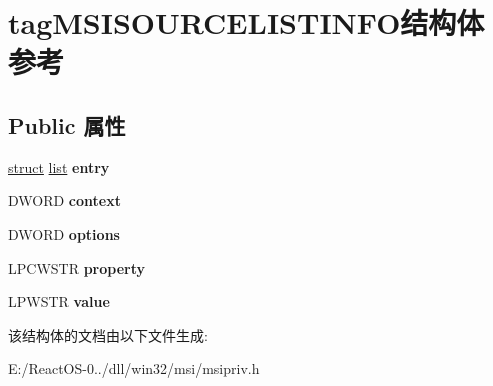 \hypertarget{structtag_m_s_i_s_o_u_r_c_e_l_i_s_t_i_n_f_o}{}\section{tag\+M\+S\+I\+S\+O\+U\+R\+C\+E\+L\+I\+S\+T\+I\+N\+F\+O结构体 参考}
\label{structtag_m_s_i_s_o_u_r_c_e_l_i_s_t_i_n_f_o}
\subsection*{Public 属性}
\begin{DoxyCompactItemize}
\item 
\mbox{\label{structtag_m_s_i_s_o_u_r_c_e_l_i_s_t_i_n_f_o_a439652af2991387df3b4a41bfffcbc79}} 
\hyperlink{interfacestruct}{struct} \hyperlink{classlist}{list} {\bfseries entry}
\item 
\mbox{\label{structtag_m_s_i_s_o_u_r_c_e_l_i_s_t_i_n_f_o_a6c3cfb35d173bd71b4206a1415ba66b3}} 
D\+W\+O\+RD {\bfseries context}
\item 
\mbox{\label{structtag_m_s_i_s_o_u_r_c_e_l_i_s_t_i_n_f_o_a5a242543cad0e8d2405b8e6141e329ba}} 
D\+W\+O\+RD {\bfseries options}
\item 
\mbox{\label{structtag_m_s_i_s_o_u_r_c_e_l_i_s_t_i_n_f_o_a18046290c74d77b8e8f7cbc879bd6414}} 
L\+P\+C\+W\+S\+TR {\bfseries property}
\item 
\mbox{\label{structtag_m_s_i_s_o_u_r_c_e_l_i_s_t_i_n_f_o_a74e6144e2b3d600399cfcac241088a14}} 
L\+P\+W\+S\+TR {\bfseries value}
\end{DoxyCompactItemize}


该结构体的文档由以下文件生成\+:\begin{DoxyCompactItemize}
\item 
E\+:/\+React\+O\+S-\/0../dll/win32/msi/msipriv.\+h\end{DoxyCompactItemize}
